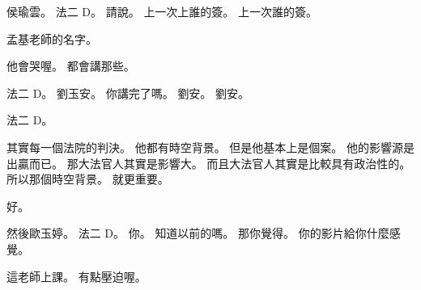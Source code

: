 \hypertarget{c01:cue:2427}{}侯瑜雲。
\hypertarget{c01:cue:2428}{}法二 D。
\hypertarget{c01:cue:2429}{}請說。
\hypertarget{c01:cue:2430}{}上一次上誰的簽。
\hypertarget{c01:cue:2431}{}上一次誰的簽。

\hypertarget{c01:cue:2432}{}孟基老師的名字。

\hypertarget{c01:cue:2433}{}他會哭喔。
\hypertarget{c01:cue:2434}{}都會講那些。

\hypertarget{c01:cue:2435}{}法二 D。
\hypertarget{c01:cue:2436}{}劉玉安。
\hypertarget{c01:cue:2437}{}你講完了嗎。
\hypertarget{c01:cue:2438}{}劉安。
\hypertarget{c01:cue:2439}{}劉安。

\hypertarget{c01:cue:2440}{}法二 D。

\hypertarget{c01:cue:2441}{}其實每一個法院的判決。
\hypertarget{c01:cue:2442}{}他都有時空背景。
\hypertarget{c01:cue:2443}{}但是他基本上是個案。
\hypertarget{c01:cue:2444}{}他的影響源是出贏而已。
\hypertarget{c01:cue:2445}{}那大法官人其實是影響大。
\hypertarget{c01:cue:2446}{}而且大法官人其實是比較具有政治性的。
\hypertarget{c01:cue:2447}{}所以那個時空背景。
\hypertarget{c01:cue:2448}{}就更重要。

\hypertarget{c01:cue:2449}{}好。

\hypertarget{c01:cue:2450}{}然後歐玉婷。
\hypertarget{c01:cue:2451}{}法二 D。
\hypertarget{c01:cue:2452}{}你。
\hypertarget{c01:cue:2453}{}知道以前的嗎。
\hypertarget{c01:cue:2454}{}那你覺得。
\hypertarget{c01:cue:2455}{}你的影片給你什麼感覺。

\hypertarget{c01:cue:2456}{}這老師上課。
\hypertarget{c01:cue:2457}{}有點壓迫喔。

